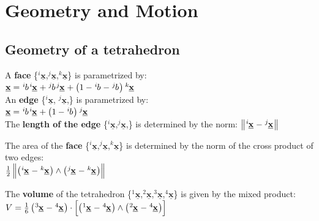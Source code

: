 \section{Geometry and Motion}
\subsection*{Geometry of a tetrahedron}
\smallskip

A \textbf{face} \{{$^i{\underline{\mathbf{x}}}$,$^j{\underline{\mathbf{x}}}$,$^k{\underline{\mathbf{x}}}$}\} is parametrized by: \\
{$\underline{\mathbf{x}} = \tensor[^i]{b}{} \tensor[^i]{\underline{\mathbf{x}}}{} + \tensor[^j]{b}{} \tensor[^j]{\underline{\mathbf{x}}}{} + \left(1- \tensor[^i]{b}{} - \tensor[^j]{b}{} \right) \tensor[^k]{\underline{\mathbf{x}}}{}$} \\

An \textbf{edge} \{{$^i{\underline{\mathbf{x}}}$, $^j{\underline{\mathbf{x}}}$,}\} is parametrized by: \\
{$\underline{\mathbf{x}} = \tensor*[^i]{b}{} \tensor[^i]{\underline{\mathbf{x}}}{} + \left(1 - \tensor[^i]{b}{} \right) \tensor[^j]{\underline{\mathbf{x}}}{} $}\\

The  \textbf{length of the edge} \{{$^i{\underline{\mathbf{x}}}$,$^j{\underline{\mathbf{x}}}$,}\} is determined by the norm:
{$\left\lVert \tensor[^i]{\underline{\mathbf{x}}}{} - \tensor[^j]{\underline{\mathbf{x}}}{} \right\rVert $}

The area of the \textbf{face} \{{$^i{\underline{\mathbf{x}}}$,$^j{\underline{\mathbf{x}}}$,$^k{\underline{\mathbf{x}}}$}\} is determined by the norm of the cross product of two edges: \\
{$\frac{1}{2} \left \| \left( \tensor[^i]{\underline{\mathbf{x}}}{} - \tensor[^k]{\underline{\mathbf{x}}}{} \right) \wedge \left( \tensor[^j]{\underline{\mathbf{x}}}{} - \tensor[^k]{\underline{\mathbf{x}}}{}\right)\right\|$}

The \textbf{volume} of the tetrahedron \{{$^1{\underline{\mathbf{x}}}$,$^2{\underline{\mathbf{x}}}$,$^3{\underline{\mathbf{x}}}$,$^4{\underline{\mathbf{x}}}$}\} is given by the mixed product: \\
{$ V = \frac{1}{6} \left(\tensor[^3]{\underline{\mathbf{x}}}{} - \tensor[^4]{\underline{\mathbf{x}}}{} \right) \cdot \left [ \left(\tensor[^1]{\underline{\mathbf{x}}}{} - \tensor[^4]{\underline{\mathbf{x}}}{} \right) \wedge \left(\tensor[^2]{\underline{\mathbf{x}}}{} - \tensor[^4]{\underline{\mathbf{x}}}{} \right) \right ]$} \\


